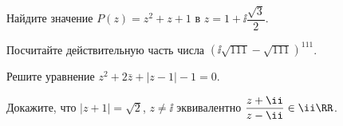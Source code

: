 %
%



\begin{problems}

\item
Найдите значение $P(z) = z^2 + z + 1$ в
$z = 1 + \ii \dfrac{\sqrt{3}}{2}$.

\item
Посчитайте действительную часть числа
$\left(\ii \sqrt{111} - \sqrt{111}\right)^{111}$.

\item
Решите уравнение
$z^2 + 2 \bar z + |z - 1| - 1 = 0$.

\item
Докажите, что
$|z + 1| = \sqrt{2}$, $z \neq \ii$
эквивалентно
$\dfrac{z + \ii}{z - \ii} \in \ii \RR$.

\end{problems}

